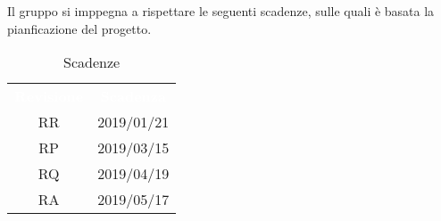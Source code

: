 Il gruppo \gruppo\space si imppegna a rispettare le seguenti scadenze, sulle quali
è basata la pianficazione del progetto.

\renewcommand{\arraystretch}{1.5}
\begin{table}[H]	
	\begin{center}
	    \begin{tabular}{ c  c  }
	        \rowcolor{greySWEight}
	        \textcolor{white}{\textbf{Revisione}} & \textcolor{white}{\textbf{Scadenza}}\\
	        RR & 2019/01/21 \\
	        RP & 2019/03/15 \\
	        RQ & 2019/04/19 \\
	        RA & 2019/05/17 \\
	    \end{tabular}
	    \caption{Scadenze} \label{tab:tabellascadenze} 
	\end{center}
\end{table}

   